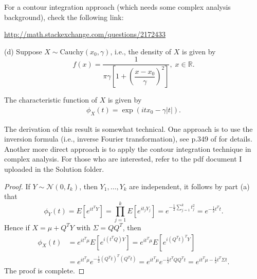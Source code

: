 \documentclass{article}
\newcommand{\real}{\mathbb{R}}
\theoremstyle{definition}
\theoremstyle{plain}
\theoremstyle{remark}
\begin{document}
\begin{description}
\begin{description}
For a contour integration approach (which needs some complex analysis background), 
check the following link:

\url{http://math.stackexchange.com/questions/2172433}

\item{(d)} Suppose $X \sim \text{Cauchy}(x_0, \gamma)$, i.e., the density of $X$ is
given by
\begin{equation*}
    f(x) = \frac{1}{\pi\gamma\left[1 + \left(\dfrac{x - x_0}{\gamma}\right)^2\right]},
    \; x \in \real.
\end{equation*}

The characteristic function of $X$ is given by
\begin{align*}
    \phi_X(t) = \exp(itx_0 - \gamma|t|).
\end{align*}

The derivation of this result is 
somewhat technical. One approach is to use the inversion formula (i.e., inverse Fourier
transformation), see p.349 of \cite{billingsley95} for details. Another more direct 
approach is to apply the contour integration technique in complex analysis. For those
who are interested, refer to the pdf document I uploaded in the Solution folder.
\end{description}
\begin{comment}
\item[Problem 3]
\begin{proof}
Let $Y_{nk} = X_k - \frac{1}{k}, k = 1, \ldots, n$, $L_n = \sum_{k = 1}^n k^{-1}$. We then have $E[Y_{nk}] = 0$, $s_n^2 = \sum_{k = 1}^n E[Y_{nk}^2] = \sum_{k = 1}^n \frac{1}{k} - \sum_{k = 1}^n \frac{1}{k^2} = L_n + O(1)$. Lindeberg's condition for $Y_{nk}$ is easily verified because these random variables are bounded by $1$. Thus the Lindeberg central limit theorem gives that $(S_n - L_n)/s_n \Rightarrow \mathcal{N}(0, 1)$. Now, in fact,
$L_n = \log n + O(1)$, and so by Slutsky's theorem that the sum can be renormalized: $(S_n - \log n)/\sqrt{\log n} \Rightarrow \mathcal{N}(0, 1)$.
\end{proof}
\end{comment}

\item[4.1(b)]
\begin{proof}
If $Y \sim \mathcal{N}(0, I_k)$, then $Y_1, \ldots, Y_k$ are independent, it follows by part (a) that
$$\phi_Y(t) = E[e^{it^TY}] = \prod_{j = 1}^k E[e^{it_jY_j}] = e^{-\frac{1}{2}\sum_{j = 1}^k t_j^2} = e^{-\frac{1}{2}t^Tt}.$$
Hence if $X = \mu + Q^T Y$ with $\Sigma = QQ^T$, then
\begin{align*}
\phi_X(t) & = e^{it^T\mu} E[e^{i(t^TQ)Y}] = e^{it^T\mu} E[e^{i(Q^Tt)^TY}] \\ 
& = e^{it^T\mu} e^{-\frac{1}{2}(Q^T t)^T(Q^T t)} = e^{it^T\mu} e^{-\frac{1}{2}t^T QQ^T t} = e^{it^T\mu - \frac{1}{2}t^T\Sigma t}. 
\end{align*}
The proof is complete.
\end{proof}


\end{description}
\end{document}
